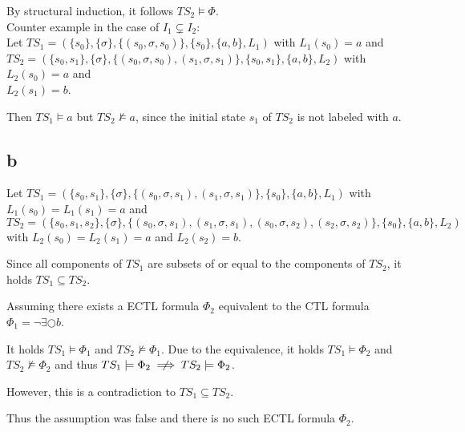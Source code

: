 \documentclass[11pt]{article}
\begin{document}
By structural induction, it follows $TS_2 \models \Phi$.\\

Counter example in the case of $I_1 \subsetneq I_2$:\\

Let $TS_1 = (\{s_0\}, \{\sigma\}, \{(s_0, \sigma, s_0)\}, \{s_0\}, \{a, b\}, L_1)$ with $L_1(s_0) = a$ and\\
$TS_2 = (\{s_0, s_1\}, \{\sigma\}, \{(s_0, \sigma, s_0), (s_1, \sigma, s_1)\}, \{s_0, s_1\}, \{a, b\}, L_2)$ with $L_2(s_0) = a$ and\\
$L_2(s_1) = b$.

Then $TS_1 \models a$ but $TS_2 \not\models a$, since the initial state $s_1$ of $TS_2$ is not labeled with $a$.

\subsection{b}

Let $TS_1 = (\{s_0, s_1\}, \{\sigma\}, \{(s_0, \sigma, s_1), (s_1, \sigma, s_1)\}, \{s_0\}, \{a, b\}, L_1)$ with $L_1(s_0) = L_1(s_1) = a$
and $TS_2 = (\{s_0, s_1, s_2\}, \{\sigma\}, \{(s_0, \sigma, s_1), (s_1, \sigma, s_1), (s_0, \sigma, s_2), (s_2, \sigma, s_2)\}, \{s_0\}, \{a, b\}, L_2)$ with $L_2(s_0) = L_2(s_1) = a$ and $L_2(s_2) = b$.

Since all components of $TS_1$ are subsets of or equal to the components of $TS_2$, it holds $TS_1 \subseteq TS_2$.

Assuming there exists a ECTL formula $\Phi_2$ equivalent to the CTL formula $\Phi_1 = \lnot \exists \bigcirc b$.

It holds $TS_1 \models \Phi_1$ and $TS_2 \not\models \Phi_1$.
Due to the equivalence, it holds $TS_1 \models \Phi_2$ and $TS_2 \not\models \Phi_2$ and thus $TS_1 \models \Phi_2 \centernot\implies TS_2 \models \Phi_2$.

However, this is a contradiction to $TS_1 \subseteq TS_2$.

Thus the assumption was false and there is no such ECTL formula $\Phi_2$.
\end{document}
